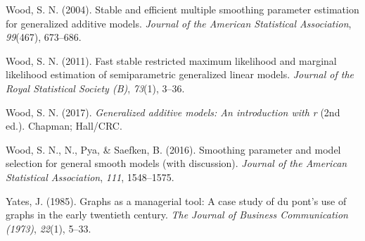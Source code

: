\documentclass[print]{nuthesis}
\newlength{\cslhangindent}
\newenvironment{CSLReferences}%
{\setlength{\parindent}{0pt}%
\everypar{\setlength{\hangindent}{\cslhangindent}}\ignorespaces}%
{\par}
\begin{document}
\begin{CSLReferences}{1}{0}
\leavevmode{}%
Wood, S. N. (2004). Stable and efficient multiple smoothing parameter estimation for generalized additive models. \emph{Journal of the American Statistical Association}, \emph{99}(467), 673--686.

\leavevmode{}%
Wood, S. N. (2011). Fast stable restricted maximum likelihood and marginal likelihood estimation of semiparametric generalized linear models. \emph{Journal of the Royal Statistical Society (B)}, \emph{73}(1), 3--36.

\leavevmode{}%
Wood, S. N. (2017). \emph{Generalized additive models: An introduction with r} (2nd ed.). Chapman; Hall/CRC.

\leavevmode{}%
Wood, S. N., N., Pya, \& Saefken, B. (2016). Smoothing parameter and model selection for general smooth models (with discussion). \emph{Journal of the American Statistical Association}, \emph{111}, 1548--1575.

\leavevmode{}%
Yates, J. (1985). Graphs as a managerial tool: A case study of du pont's use of graphs in the early twentieth century. \emph{The Journal of Business Communication (1973)}, \emph{22}(1), 5--33.

\end{CSLReferences}


\backmatter

% 






\end{document}
